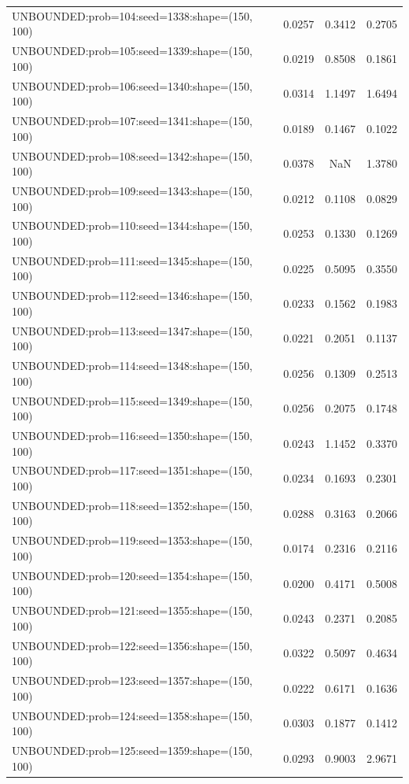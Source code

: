 \begin{longtable}{lccc}
UNBOUNDED:prob=104:seed=1338:shape=(150, 100) &   0.0257 &  0.3412 &  0.2705 \\
UNBOUNDED:prob=105:seed=1339:shape=(150, 100) &   0.0219 &  0.8508 &  0.1861 \\
UNBOUNDED:prob=106:seed=1340:shape=(150, 100) &   0.0314 &  1.1497 &  1.6494 \\
UNBOUNDED:prob=107:seed=1341:shape=(150, 100) &   0.0189 &  0.1467 &  0.1022 \\
UNBOUNDED:prob=108:seed=1342:shape=(150, 100) &   0.0378 &     NaN &  1.3780 \\
UNBOUNDED:prob=109:seed=1343:shape=(150, 100) &   0.0212 &  0.1108 &  0.0829 \\
UNBOUNDED:prob=110:seed=1344:shape=(150, 100) &   0.0253 &  0.1330 &  0.1269 \\
UNBOUNDED:prob=111:seed=1345:shape=(150, 100) &   0.0225 &  0.5095 &  0.3550 \\
UNBOUNDED:prob=112:seed=1346:shape=(150, 100) &   0.0233 &  0.1562 &  0.1983 \\
UNBOUNDED:prob=113:seed=1347:shape=(150, 100) &   0.0221 &  0.2051 &  0.1137 \\
UNBOUNDED:prob=114:seed=1348:shape=(150, 100) &   0.0256 &  0.1309 &  0.2513 \\
UNBOUNDED:prob=115:seed=1349:shape=(150, 100) &   0.0256 &  0.2075 &  0.1748 \\
UNBOUNDED:prob=116:seed=1350:shape=(150, 100) &   0.0243 &  1.1452 &  0.3370 \\
UNBOUNDED:prob=117:seed=1351:shape=(150, 100) &   0.0234 &  0.1693 &  0.2301 \\
UNBOUNDED:prob=118:seed=1352:shape=(150, 100) &   0.0288 &  0.3163 &  0.2066 \\
UNBOUNDED:prob=119:seed=1353:shape=(150, 100) &   0.0174 &  0.2316 &  0.2116 \\
UNBOUNDED:prob=120:seed=1354:shape=(150, 100) &   0.0200 &  0.4171 &  0.5008 \\
UNBOUNDED:prob=121:seed=1355:shape=(150, 100) &   0.0243 &  0.2371 &  0.2085 \\
UNBOUNDED:prob=122:seed=1356:shape=(150, 100) &   0.0322 &  0.5097 &  0.4634 \\
UNBOUNDED:prob=123:seed=1357:shape=(150, 100) &   0.0222 &  0.6171 &  0.1636 \\
UNBOUNDED:prob=124:seed=1358:shape=(150, 100) &   0.0303 &  0.1877 &  0.1412 \\
UNBOUNDED:prob=125:seed=1359:shape=(150, 100) &   0.0293 &  0.9003 &  2.9671 \\

\end{longtable}

